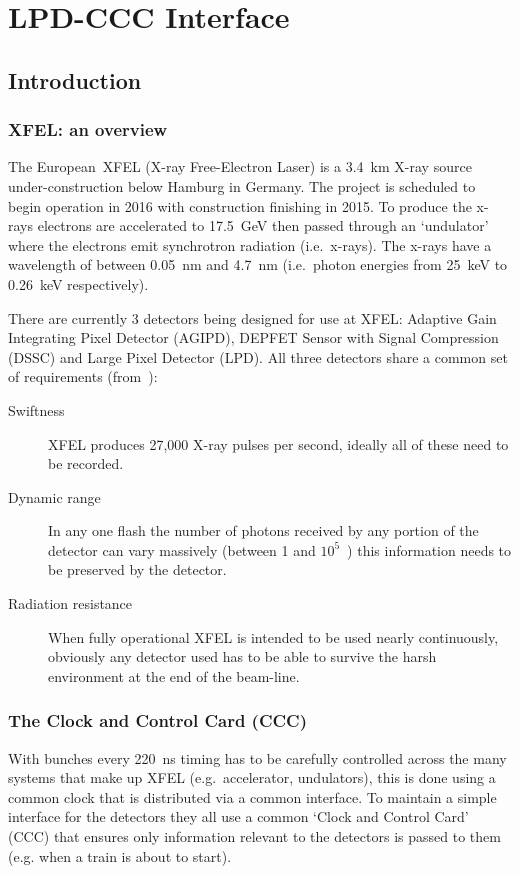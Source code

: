 \part{LPD-CCC Interface} %
\label{prt:lpd_ccc_interface}
\chapter{Introduction} %
\label{cha:lpd_ccc_introduction}
\section{XFEL: an overview} %
\label{sec:xfel_an_overview}
The European~XFEL (X-ray Free-Electron Laser) is a 3.4~km X-ray source under-construction below Hamburg in Germany. The project is scheduled to begin operation in 2016 with construction finishing in 2015. To produce the x-rays electrons are accelerated to 17.5~GeV then passed through an `undulator' where the electrons emit synchrotron radiation (i.e.\ x-rays). The x-rays have a wavelength of between 0.05~nm and 4.7~nm (i.e.\ photon energies from 25~keV to 0.26~keV respectively). 
    
There are currently 3 detectors being designed for use at XFEL: Adaptive Gain Integrating Pixel Detector (AGIPD), DEPFET Sensor with Signal Compression (DSSC) and Large Pixel Detector (LPD). All three detectors share a common set of requirements (from~\cite{xfel_website}):
\begin{description}
    \item[Swiftness] XFEL produces 27,000 X-ray pulses per second, ideally all of these need to be recorded.
    \item[Dynamic range] In any one flash the number of photons received by any portion of the detector can vary massively (between 1 and \(10^5\)~\cite{lpd_manual}) this information needs to be preserved by the detector.
    \item[Radiation resistance] When fully operational XFEL is intended to be used nearly continuously, obviously any detector used has to be able to survive the harsh environment at the end of the beam-line.
\end{description}
\section{The Clock and Control Card (CCC)} %
\label{sec:the_clock_and_control_card_ccc}
With bunches every 220~ns timing has to be carefully controlled across the many systems  that make up XFEL (e.g.\ accelerator, undulators), this is done using a common clock that is distributed via a common interface. To maintain a simple interface for the detectors they all use a common `Clock and Control Card' (CCC) that ensures only information relevant to the detectors is passed to them (e.g. when a train is about to start). 
    
